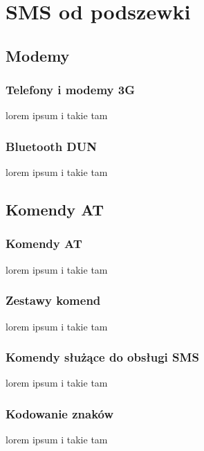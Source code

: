 \documentclass[xcolor=table]{beamer}
\begin{document}
\section{SMS od podszewki}

\subsection{Modemy}
\begin{frame}
  \frametitle{Telefony i modemy 3G}

lorem ipsum i takie tam

\end{frame}

\begin{frame}
  \frametitle{Bluetooth DUN}

lorem ipsum i takie tam

\end{frame}
\subsection{Komendy AT}
\begin{frame}
  \frametitle{Komendy AT}

lorem ipsum i takie tam

\end{frame}

\begin{frame}
  \frametitle{Zestawy komend}

lorem ipsum i takie tam

\end{frame}
\begin{frame}
  \frametitle{Komendy służące do obsługi SMS}

lorem ipsum i takie tam

\end{frame}
\begin{frame}
  \frametitle{Kodowanie znaków}

lorem ipsum i takie tam

\end{frame}

\end{document}
